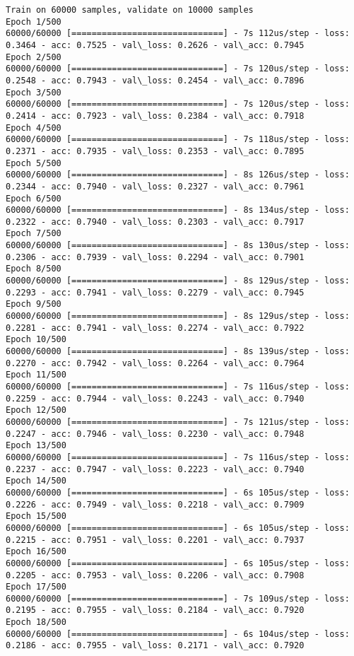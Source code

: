 \documentclass[11pt]{article}
\begin{document}
    \begin{Verbatim}[commandchars=\\\{\}]
Train on 60000 samples, validate on 10000 samples
Epoch 1/500
60000/60000 [==============================] - 7s 112us/step - loss: 0.3464 - acc: 0.7525 - val\_loss: 0.2626 - val\_acc: 0.7945
Epoch 2/500
60000/60000 [==============================] - 7s 120us/step - loss: 0.2548 - acc: 0.7943 - val\_loss: 0.2454 - val\_acc: 0.7896
Epoch 3/500
60000/60000 [==============================] - 7s 120us/step - loss: 0.2414 - acc: 0.7923 - val\_loss: 0.2384 - val\_acc: 0.7918
Epoch 4/500
60000/60000 [==============================] - 7s 118us/step - loss: 0.2371 - acc: 0.7935 - val\_loss: 0.2353 - val\_acc: 0.7895
Epoch 5/500
60000/60000 [==============================] - 8s 126us/step - loss: 0.2344 - acc: 0.7940 - val\_loss: 0.2327 - val\_acc: 0.7961
Epoch 6/500
60000/60000 [==============================] - 8s 134us/step - loss: 0.2322 - acc: 0.7940 - val\_loss: 0.2303 - val\_acc: 0.7917
Epoch 7/500
60000/60000 [==============================] - 8s 130us/step - loss: 0.2306 - acc: 0.7939 - val\_loss: 0.2294 - val\_acc: 0.7901
Epoch 8/500
60000/60000 [==============================] - 8s 129us/step - loss: 0.2293 - acc: 0.7941 - val\_loss: 0.2279 - val\_acc: 0.7945
Epoch 9/500
60000/60000 [==============================] - 8s 129us/step - loss: 0.2281 - acc: 0.7941 - val\_loss: 0.2274 - val\_acc: 0.7922
Epoch 10/500
60000/60000 [==============================] - 8s 139us/step - loss: 0.2270 - acc: 0.7942 - val\_loss: 0.2264 - val\_acc: 0.7964
Epoch 11/500
60000/60000 [==============================] - 7s 116us/step - loss: 0.2259 - acc: 0.7944 - val\_loss: 0.2243 - val\_acc: 0.7940
Epoch 12/500
60000/60000 [==============================] - 7s 121us/step - loss: 0.2247 - acc: 0.7946 - val\_loss: 0.2230 - val\_acc: 0.7948
Epoch 13/500
60000/60000 [==============================] - 7s 116us/step - loss: 0.2237 - acc: 0.7947 - val\_loss: 0.2223 - val\_acc: 0.7940
Epoch 14/500
60000/60000 [==============================] - 6s 105us/step - loss: 0.2226 - acc: 0.7949 - val\_loss: 0.2218 - val\_acc: 0.7909
Epoch 15/500
60000/60000 [==============================] - 6s 105us/step - loss: 0.2215 - acc: 0.7951 - val\_loss: 0.2201 - val\_acc: 0.7937
Epoch 16/500
60000/60000 [==============================] - 6s 105us/step - loss: 0.2205 - acc: 0.7953 - val\_loss: 0.2206 - val\_acc: 0.7908
Epoch 17/500
60000/60000 [==============================] - 7s 109us/step - loss: 0.2195 - acc: 0.7955 - val\_loss: 0.2184 - val\_acc: 0.7920
Epoch 18/500
60000/60000 [==============================] - 6s 104us/step - loss: 0.2186 - acc: 0.7955 - val\_loss: 0.2171 - val\_acc: 0.7920

\end{Verbatim}
\end{document}
